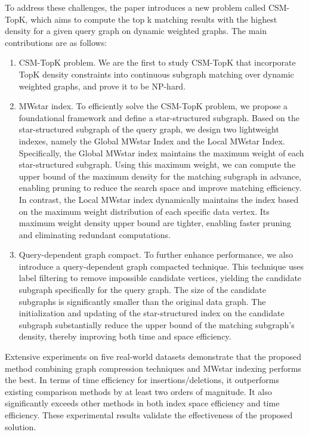 \begin{enabstract}
	
	To address these challenges, the paper introduces a new problem called CSM-TopK, which aims to compute the top k matching results with the highest density for a given query graph on dynamic weighted graphs.
	The main contributions are as follows:
	\begin{enumerate}[label=(\arabic*)]  
		\item CSM-TopK problem. We are the first to study CSM-TopK that incorporate TopK density constraints into
		continuous subgraph matching over dynamic weighted graphs, and prove it to be NP-hard.
		\item MWstar index. To efficiently solve the CSM-TopK problem, we propose a foundational framework and define a star-structured subgraph.
		Based on the star-structured subgraph of the query graph, we design two lightweight indexes, namely the Global MWstar Index and the Local MWstar Index. 
		Specifically, the Global MWstar index maintains the maximum weight of each star-structured subgraph. 
		Using this maximum weight, we can compute the upper bound of the maximum density for the matching subgraph in advance, enabling pruning to reduce the search space and improve matching efficiency. 
		In contrast, the Local MWstar index dynamically maintains the index based on the maximum weight distribution of each specific data vertex. 
		Its maximum weight density upper bound are tighter, enabling faster pruning and eliminating redundant computations.
		\item Query-dependent graph compact. To further enhance performance, we also introduce a query-dependent graph compacted technique. 
		This technique uses label filtering to remove impossible candidate vertices, yielding the candidate subgraph specifically for the query graph. 
		The size of the candidate subgraphs is significantly smaller than the original data graph. 
		The initialization and updating of the star-structured index on the candidate subgraph substantially reduce the upper bound of the matching subgraph's density, thereby improving both time and space efficiency.
		\end{enumerate}

		Extensive experiments on five real-world datasets demonstrate that the proposed method combining graph compression techniques and MWstar indexing performs the best. 
		In terms of time efficiency for insertions/deletions, it outperforms existing comparison methods by at least two orders of magnitude. 
		It also significantly exceeds other methods in both index space efficiency and time efficiency. 
		These experimental results validate the effectiveness of the proposed solution.
\end{enabstract}